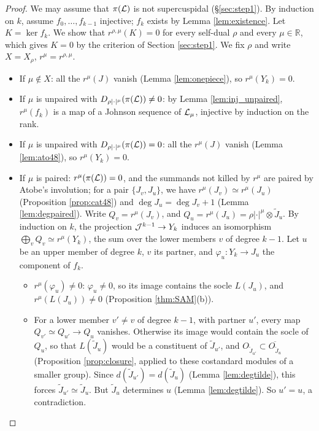 \documentclass[a4paper,12pt,leqno]{amsart}
\theoremstyle{plain}
\theoremstyle{definition}
\begin{document}
\begin{proof}
We may assume that $\pi(\mathcal{L})$ is not supercuspidal (\S\ref{sec:step1}). By induction on $k$, assume
$f_0,\ldots,f_{k-1}$ injective; $f_k$ exists by Lemma
\ref{lem:existence}. Let $K=\ker f_k$. We show that $r^{\rho,\mu}(K)=0$ for every self-dual $\rho$ and every
$\mu\in\mathbb R$, which gives $K=0$ by the criterion of Section \ref{sec:step1}. We fix $\rho$ and write
$X=X_\rho$, $r^\mu=r^{\rho,\mu}$.
\begin{itemize}
\item If $\mu\notin X$: all the $r^\mu(J)$ vanish (Lemma \ref{lem:onepiece}), so $r^\mu(Y_k)=0$.
\item If $\mu$ is unpaired with $D_{\rho|\cdot|^\mu}(\pi(\mathcal{L}))\neq0$: by Lemma \ref{lem:inj_unpaired},
$r^\mu(f_k)$ is a map of a Johnson sequence of $\mathcal{L}_\mu$, injective by induction on the rank.
\item If $\mu$ is unpaired with $D_{\rho|\cdot|^\mu}(\pi(\mathcal{L}))=0$: all the $r^\mu(J)$ vanish
(Lemma \ref{lem:ato48}), so $r^\mu(Y_k)=0$.
\item If $\mu$ is paired: $r^\mu(\pi(\mathcal{L}))=0$, and the summands not killed by $r^\mu$ are paired by Atobe's involution;
for a pair $\{J_v,J_u\}$, we have $r^\mu(J_v)\simeq r^\mu(J_u)$ (Proposition \ref{prop:cat48}) and
$\deg J_u=\deg J_v+1$ (Lemma \ref{lem:degpaired}). Write $Q_v=r^\mu(J_v)$, and $Q_u=r^\mu(J_u)=\rho|\cdot|^\mu\otimes
\widetilde J_u$. By induction on $k$, the projection $\mathcal{J}^{k-1}\to Y_k$ induces an isomorphism
$\bigoplus_vQ_v\simeq r^\mu(Y_k)$, the sum over the lower members $v$ of degree $k-1$. Let $u$ be an
upper member of degree $k$, $v$ its partner, and $\varphi_u:Y_k\to J_u$ the component of $f_k$.
\begin{itemize}
\item[--] $r^\mu(\varphi_u)\neq0$: $\varphi_u\neq0$, so its image contains the socle $L(J_u)$, and
$r^\mu(L(J_u))\neq0$ (Proposition \ref{thm:SAM}(b)).
\item[--] For a lower member $v'\neq v$ of degree $k-1$, with partner $u'$, every map
$Q_{v'}\simeq Q_{u'}\to Q_u$ vanishes. Otherwise its image would contain the socle of $Q_u$, so that
$L(\widetilde J_u)$ would be a constituent of $\widetilde J_{u'}$, and
$O_{\widetilde J_{u'}}\subset\overline{O_{\widetilde J_u}}$ (Proposition \ref{prop:closure}, applied to
these costandard modules of a smaller group). Since $d(\widetilde J_{u'})=d(\widetilde J_u)$ (Lemma
\ref{lem:degtilde}), this forces $\widetilde J_{u'}\simeq\widetilde J_u$. But $\widetilde J_u$
determines $u$ (Lemma \ref{lem:degtilde}). So $u'=u$, a contradiction.

\end{itemize}
\end{itemize}
\end{proof}
\end{document}

